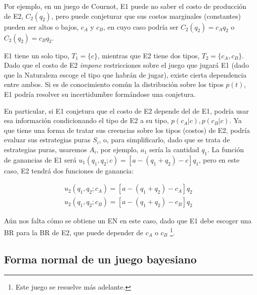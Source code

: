 \documentclass[12pt]{article}
\begin{document}
Por ejemplo, en un juego de Cournot, E1 puede no saber el costo de producción de E2, $C_2(q_2)$, pero puede conjeturar que sus costos marginales (constantes) pueden ser altos o bajos, $c_A$ y $c_B$, en cuyo caso podría ser $C_2(q_2)=c_Aq_2$ o $C_2(q_2)=c_Bq_2$.

E1 tiene un solo tipo,  $T_1 = \{c\}$, mientras que E2 tiene dos tipos, $T_2 = \{c_A, c_B\}$. Dado que el costo de E2 \textit{impone} restricciones sobre el juego que jugará E1 (dado que la Naturaleza escoge el tipo que habrán de jugar), existe cierta dependencia entre ambos. Si es de conocimiento común la distribución sobre los tipos $p(t)$, E1 podría resolver su incertidumbre formándose una conjetura.

En particular, si E1 conjetura que el costo de E2 depende del de E1, podría usar esa información condicionando el tipo de E2 a su tipo, $p(c_A|c), p(c_B|c)$. Ya que tiene una forma de tratar sus creencias sobre los tipos (costos) de E2, podría evaluar sus estrategias puras $S_i$, o, para simplificarlo, dado que se trata de estrategias puras, usaremos $A_i$, por ejemplo, $a_1$ sería la cantidad $q_1$. La función de ganancias de E1 será $u_1(q_1, q_2;c) = [a - (q_1 + q_2) - c]q_1$, pero en este caso, E2 tendrá dos funciones de ganancia:

\begin{align*}
	u_2(q_1, q_2;c_A) =  [a - (q_1 + q_2) - c_A]q_2 \\
	u_2(q_1, q_2;c_B) =  [a - (q_1 + q_2) - c_B]q_2
\end{align*}

Aún nos falta cómo se obtiene un EN en este caso, dado que E1 debe escoger una BR para la BR de E2, que puede depender de $c_A$ o $c_B$ \footnote{Este juego se resuelve más adelante.}.

\subsection{Forma normal de un juego bayesiano}
\end{document}

